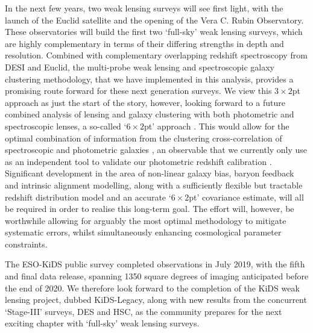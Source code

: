 In the next few years, two weak lensing surveys will see first light, with the launch of the Euclid satellite and the opening of the Vera C. Rubin Observatory.   These observatories will build the first two `full-sky' weak lensing surveys, which are highly complementary in terms of their differing strengths in depth and resolution.  Combined with complementary overlapping redshift spectroscopy from DESI and Euclid, the multi-probe weak lensing and spectroscopic galaxy clustering methodology, that we have implemented in this analysis, provides a promising route forward for these next generation surveys.   We view this $3\times2$pt approach as just the start of the story, however, looking forward to a future combined analysis of lensing and galaxy clustering with both photometric and spectroscopic lenses, a so-called `$6\times2$pt' approach \citep{bernstein:2009}.    This would allow for the optimal combination of information from the clustering cross-correlation of spectroscopic and photometric galaxies \citep{newman:2008}, an observable that we currently only use as an independent tool to validate our photometric redshift calibration \citep{hildebrandt/etal:inprep}.      Significant development in the area of non-linear galaxy bias, baryon feedback and intrinsic alignment modelling, along with a sufficiently flexible but tractable redshift distribution model and an accurate `$6\times2$pt' covariance estimate, will all be required in order to realise this long-term goal.   The effort will, however, be worthwhile allowing for arguably the most optimal methodology to mitigate systematic errors, whilst simultaneously enhancing cosmological parameter constraints.

The ESO-KiDS public survey completed observations in July 2019, with the fifth and final data release, spanning 1350 square degrees of imaging anticipated before the end of 2020.  We therefore look forward to the completion of the KiDS weak lensing project, dubbed KiDS-Legacy, along with new results from the concurrent `Stage-III' surveys, DES and HSC, as the community prepares for the next exciting chapter with `full-sky' weak lensing surveys.  